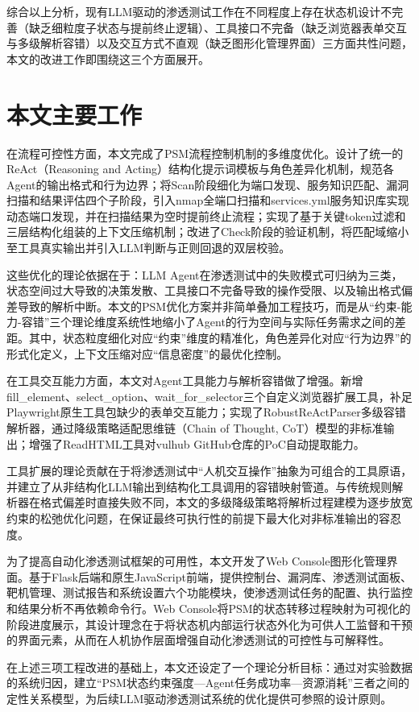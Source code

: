 综合以上分析，现有LLM驱动的渗透测试工作在不同程度上存在状态机设计不完善（缺乏细粒度子状态与提前终止逻辑）、工具接口不完备（缺乏浏览器表单交互与多级解析容错）以及交互方式不直观（缺乏图形化管理界面）三方面共性问题，本文的改进工作即围绕这三个方面展开。

\section{本文主要工作}

在流程可控性方面，本文完成了PSM流程控制机制的多维度优化。设计了统一的ReAct（Reasoning and Acting）结构化提示词模板与角色差异化机制，规范各Agent的输出格式和行为边界；将Scan阶段细化为端口发现、服务知识匹配、漏洞扫描和结果评估四个子阶段，引入nmap全端口扫描和services.yml服务知识库实现动态端口发现，并在扫描结果为空时提前终止流程；实现了基于关键token过滤和三层结构化组装的上下文压缩机制；改进了Check阶段的验证机制，将匹配域缩小至工具真实输出并引入LLM判断与正则回退的双层校验。

这些优化的理论依据在于：LLM Agent在渗透测试中的失败模式可归纳为三类，状态空间过大导致的决策发散、工具接口不完备导致的操作受限、以及输出格式偏差导致的解析中断。本文的PSM优化方案并非简单叠加工程技巧，而是从“约束-能力-容错”三个理论维度系统性地缩小了Agent的行为空间与实际任务需求之间的差距。其中，状态粒度细化对应“约束”维度的精准化，角色差异化对应“行为边界”的形式化定义，上下文压缩对应“信息密度”的最优化控制。

在工具交互能力方面，本文对Agent工具能力与解析容错做了增强。新增fill\_element、select\_option、wait\_for\_selector三个自定义浏览器扩展工具，补足Playwright原生工具包缺少的表单交互能力；实现了RobustReActParser多级容错解析器，通过降级策略适配思维链（Chain of Thought, CoT）模型的非标准输出；增强了ReadHTML工具对vulhub GitHub仓库的PoC自动提取能力。

工具扩展的理论贡献在于将渗透测试中“人机交互操作”抽象为可组合的工具原语，并建立了从非结构化LLM输出到结构化工具调用的容错映射管道。与传统规则解析器在格式偏差时直接失败不同，本文的多级降级策略将解析过程建模为逐步放宽约束的松弛优化问题，在保证最终可执行性的前提下最大化对非标准输出的容忍度。

为了提高自动化渗透测试框架的可用性，本文开发了Web Console图形化管理界面。基于Flask后端和原生JavaScript前端，提供控制台、漏洞库、渗透测试面板、靶机管理、测试报告和系统设置六个功能模块，使渗透测试任务的配置、执行监控和结果分析不再依赖命令行。Web Console将PSM的状态转移过程映射为可视化的阶段进度展示，其设计理念在于将状态机内部运行状态外化为可供人工监督和干预的界面元素，从而在人机协作层面增强自动化渗透测试的可控性与可解释性。

在上述三项工程改进的基础上，本文还设定了一个理论分析目标：通过对实验数据的系统归因，建立“PSM状态约束强度—Agent任务成功率—资源消耗”三者之间的定性关系模型，为后续LLM驱动渗透测试系统的优化提供可参照的设计原则。

